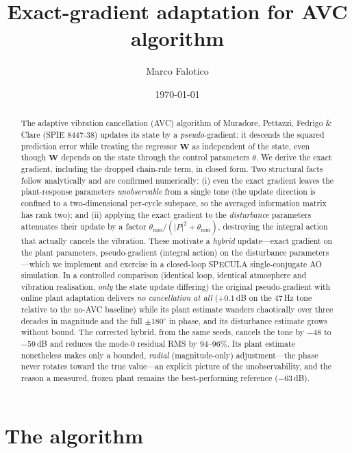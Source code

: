 \documentclass[11pt]{article}
\title{Exact-gradient adaptation for AVC algorithm}
\author{Marco Falotico}
\date{\today}
\newcommand{\SI}[2]{#1\,#2}
\newcommand{\vW}{\mathbf{W}}
\begin{document}
\maketitle

\begin{abstract}
The adaptive vibration cancellation (AVC) algorithm of Muradore, Pettazzi,
Fedrigo \& Clare (SPIE 8447-38) updates its state by a \emph{pseudo}-gradient:
it descends the squared prediction error while treating the regressor
$\vW$ as independent of the state, even though $\vW$ depends on the state
through the control parameters $\theta$. We derive the exact gradient,
including the dropped chain-rule term, in closed form. Two structural facts
follow analytically and are confirmed numerically: (i) even the exact
gradient leaves the plant-response parameters \emph{unobservable} from a
single tone (the update direction is confined to a two-dimensional
per-cycle subspace, so the averaged information matrix has rank two); and
(ii) applying the exact gradient to the \emph{disturbance} parameters
attenuates their update by a factor $\theta_{\min}/(|P|^2+\theta_{\min})$,
destroying the integral action that actually cancels the vibration. These
motivate a \emph{hybrid} update---exact gradient on the plant parameters,
pseudo-gradient (integral action) on the disturbance parameters---which we
implement and exercise in a closed-loop SPECULA single-conjugate AO
simulation. In a controlled comparison (identical loop, identical
atmosphere and vibration realisation, \emph{only} the state update
differing) the original pseudo-gradient with online plant adaptation
delivers \emph{no cancellation at all} ($+0.1$\,dB on the \SI{47}{Hz} tone
relative to the no-AVC baseline) while its plant estimate wanders
chaotically over three decades in magnitude and the full $\pm180^\circ$ in
phase, and its disturbance estimate grows without bound. The corrected
hybrid, from the same seeds, cancels the tone by $-48$ to $-59$\,dB and
reduces the mode-0 residual RMS by $94$--$96\%$. Its plant estimate
nonetheless makes only a bounded, \emph{radial} (magnitude-only)
adjustment---the phase never rotates toward the true value---an explicit
picture of the unobservability, and the reason a measured, frozen plant
remains the best-performing reference ($-63$\,dB).
\end{abstract}

\section{The algorithm}
\label{sec:alg}
\end{document}
